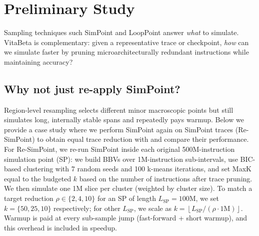 

\section{Preliminary Study}
Sampling techniques such SimPoint and LoopPoint answer \emph{what} to simulate. VitaBeta is complementary: given a representative trace or checkpoint, \emph{how} can we simulate faster by pruning microarchitecturally redundant instructions while maintaining accuracy?

\subsection*{Why not just re-apply SimPoint?}
Region-level resampling selects different minor macroscopic points but still simulates long, internally stable spans and repeatedly pays warmup. Below we provide a case study where we perform SimPoint again on SimPoint traces (Re-SimPoint) to obtain equal trace reduction with \name and compare their performance. For Re-SimPoint, we re-run SimPoint inside each original 500M-instruction simulation point (SP): we build BBVs over 1M-instruction sub-intervals, use BIC-based clustering with 7 random seeds and 100 k-means iterations, and set MaxK equal to the budgeted $k$ based on the number of instructions after trace pruning. We then simulate one 1M slice per cluster (weighted by cluster size). To match a target reduction $\rho\!\in\!\{2,4,10\}$ for an SP of length $L_{\text{SP}}{=}100$M, we set $k{=}\{50,25,10\}$ respectively; for other $L_{\text{SP}}$, we scale as $k=\left\lfloor L_{\text{SP}}/(\rho\cdot 1\text{M})\right\rfloor$. Warmup is paid at every sub-sample jump (fast-forward + short warmup), and this overhead is included in speedup.
 
